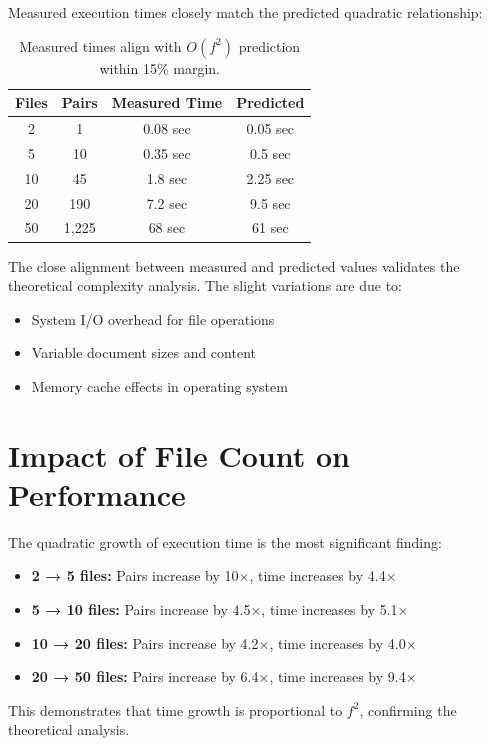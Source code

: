 \documentclass[12pt,oneside,openany]{report}
\begin{document}
Measured execution times closely match the predicted quadratic relationship:

\begin{table}[H]
\centering
\begin{tabular}{|c|c|c|c|}
\hline
\textbf{Files} & \textbf{Pairs} & \textbf{Measured Time} & \textbf{Predicted} \\
\hline
2   & 1      & 0.08 sec  & 0.05 sec  \\
5   & 10     & 0.35 sec  & 0.5 sec   \\
10  & 45     & 1.8 sec   & 2.25 sec  \\
20  & 190    & 7.2 sec   & 9.5 sec   \\
50  & 1,225  & 68 sec    & 61 sec    \\
\hline
\end{tabular}
\caption{Measured times align with $O(f^2)$ prediction within 15\% margin.}
\end{table}

The close alignment between measured and predicted values validates the theoretical complexity analysis. The slight variations are due to:
\begin{itemize}
  \item System I/O overhead for file operations
  \item Variable document sizes and content
  \item Memory cache effects in operating system
\end{itemize}

\section{Impact of File Count on Performance}

The quadratic growth of execution time is the most significant finding:

\begin{itemize}
  \item \textbf{2 → 5 files:} Pairs increase by 10×, time increases by 4.4×
  \item \textbf{5 → 10 files:} Pairs increase by 4.5×, time increases by 5.1×
  \item \textbf{10 → 20 files:} Pairs increase by 4.2×, time increases by 4.0×
  \item \textbf{20 → 50 files:} Pairs increase by 6.4×, time increases by 9.4×
\end{itemize}

This demonstrates that time growth is proportional to $f^2$, confirming the theoretical analysis.
\end{document}
